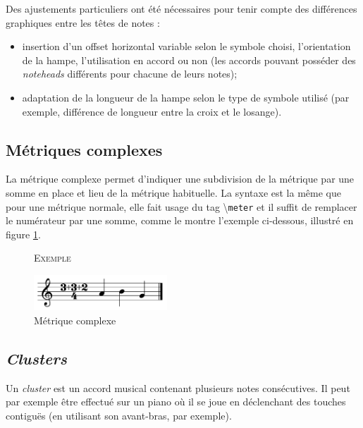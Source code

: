 \documentclass{article}
\newenvironment{gmncode}	{\vspace{-2mm}\small\verbatim}{\endverbatim\vspace{-2mm}}
\newcommand{\code}[1]		{{\small \texttt{#1}}}
\newcommand{\guidotag}[1]	{\textbackslash\code{#1}}
\newcommand{\exemple}		{\vspace{2mm}\hspace*{-3mm}\textsc{Exemple}}
\begin{document}
Des ajustements particuliers ont été nécessaires pour tenir compte des différences graphiques entre les têtes de notes :
\begin{itemize}
    \item insertion d'un offset horizontal variable selon le symbole choisi, l'orientation de la hampe, l'utilisation en accord ou non (les accords pouvant posséder des \emph{noteheads} différents pour chacune de leurs notes);
    \item adaptation de la longueur de la hampe selon le type de symbole utilisé (par exemple, différence de longueur entre la croix et le losange).
\end{itemize}


\subsection{Métriques complexes}\label{subsec:metriques}

La métrique complexe permet d'indiquer une subdivision de la métrique par une somme en place et lieu de la métrique habituelle. La syntaxe est la même que pour une métrique normale, elle fait usage du tag \guidotag{meter} et il suffit de remplacer le numérateur par une somme, comme le montre l'exemple ci-dessous, illustré en figure \ref{fig:complexMeter}.

\begin{figure}[h]
\exemple
\begin{gmncode}
  [ \meter<"3+3+2/4"> a b g ]
\end{gmncode}
\begin{center}
\includegraphics[width=50mm]{img/partitions/complexMeter.pdf}
\end{center}
\caption{Métrique complexe}
\label{fig:complexMeter}
\end{figure}

\subsection{\emph{Clusters}}\label{subsec:clusters}

Un \emph{cluster} est un accord musical contenant plusieurs notes consécutives. Il peut par exemple être effectué sur un piano où il se joue en déclenchant des touches contiguës (en utilisant son avant-bras, par exemple).
\end{document}
